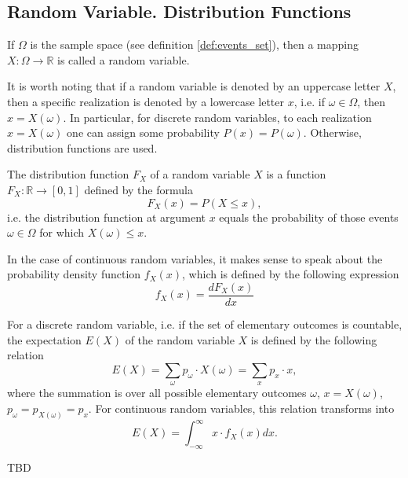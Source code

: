 \subsection{Random Variable. Distribution Functions}

\begin{definition}
\label{def:random_variable}
If $\Omega$ is the sample space (see definition \autoref{def:events_set}), then 
a mapping $X: \Omega \to \mathbb{R}$ is called a random
variable. 
\end{definition}

It is worth noting that if a random variable is denoted by 
an uppercase letter $X$, then a specific realization is denoted by a lowercase letter
$x$, i.e. if $\omega \in \Omega$, then $x = X(\omega)$. 
In particular, for discrete random variables, to each realization
$x = X(\omega)$ one can assign some probability
$P\left(x\right) = P\left(\omega\right)$. 
Otherwise, distribution functions are used.

\begin{definition}
The distribution function $F_X$ of a random variable $X$ is a function
$F_X : \mathbb{R} \to [0,1]$ defined by the formula
\[
F_X \left(x\right) = P\left(X \le x\right),
\]
i.e. the distribution function at argument $x$ equals the probability of those
events $\omega \in \Omega$ for which
$X(\omega) \le x$.
\end{definition}

\begin{definition}
In the case of continuous random variables, it makes sense to speak about the
probability density function $f_X\left(x\right)$, 
which is defined by the following expression 
\[
f_X\left(x\right) = 
\frac{d F_X\left(x\right)}{d x}
\]
\end{definition}

\begin{definition}
For a discrete random variable, i.e. if the set of elementary
outcomes is countable, the expectation $E\left(X\right)$ of the random variable $X$
is defined by the following relation
\[
E\left(X\right) = \sum_\omega p_\omega \cdot X(\omega) = 
\sum_x p_x \cdot x,
\] 
where the summation is over all possible elementary outcomes
$\omega$, $x = X(\omega)$, $p_\omega = p_{X(\omega)} = p_x$.
For continuous random variables, this relation transforms into 
\[
E\left(X\right) = \int_{-\infty}^\infty x \cdot f_X\left(x\right) dx.
\]
\end{definition}


TBD
